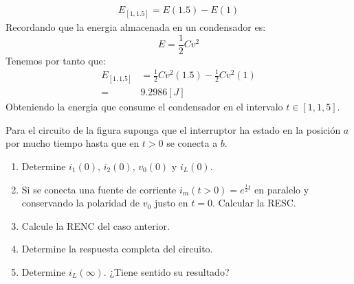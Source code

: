 \documentclass[
  11pt,
  letterpaper,
   addpoints,
   answers
  ]{exam}
\begin{document}
\begin{questions}
\begin{solution}
\begin{enumerate}
            \begin{align}
            E_{[1, 1.5]}= E(1.5) - E(1)
        \end{align}
            Recordando que la energia almacenada en un condensador es:
        \begin{equation}
            E = \frac{1}{2}C v^{2}
        \end{equation}
        Tenemos por tanto que:
        \begin{align}
            E_{[1, 1.5]} &= \frac{1}{2}C v^{2}(1.5) - \frac{1}{2}C v^{2}(1)\\
            =&9.2986[J]
        \end{align}
        Obteniendo la energia que consume el condensador en el intervalo $t \in [1, 1{,}5]$.
    \end{enumerate}
    \end{solution}
    \question

    Para el circuito de la figura  suponga que el interruptor ha estado en la posición \( a \) por mucho tiempo hasta que en \( t > 0 \) se conecta a \( b \).

\begin{enumerate}
    \item Determine \( i_1(0) \), \( i_2(0) \), \( v_0(0) \) y \( i_L(0) \).
    
    \item Si se conecta una fuente de corriente \( i_m(t > 0) = e^{\frac{1}{2}t} \) en paralelo y conservando la polaridad de \( v_0 \) justo en \( t = 0 \). Calcular la RESC.
    
    \item Calcule la RENC del caso anterior.
    
    \item Determine la respuesta completa del circuito.
    
    \item Determine \( i_L(\infty) \). ¿Tiene sentido su resultado?
    

\end{enumerate}
\end{questions}
\end{document}
